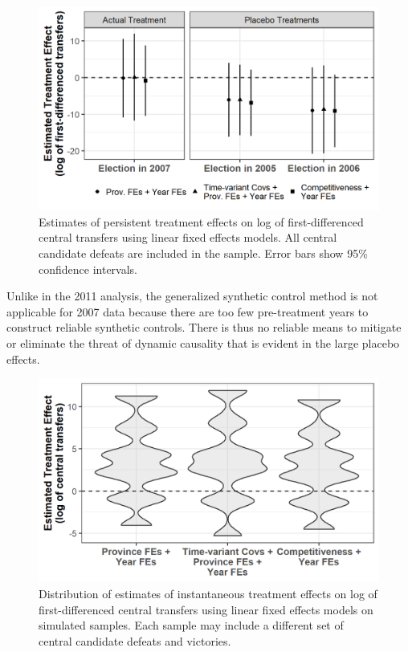 \documentclass[12pt]{article}
\newcommand{\1}{\mathbbm{1}}
\begin{document}
\begin{figure}[!htbp]
	\centering
	\includegraphics[]{figure/210202_lfe_placebo_2007.png}
	\captionsetup{singlelinecheck=off}
	\caption[Estimated placebo linear fixed effects treatment effects]{Estimates of persistent treatment effects on log of first-differenced central transfers using linear fixed effects models. All central candidate defeats are included in the sample. Error bars show 95\% confidence intervals.}
	\label{fig:lfe_placebo_2007}
\end{figure}

Unlike in the 2011 analysis, the generalized synthetic control method \citep{Xu2017gsynth} is not applicable for 2007 data because there are too few pre-treatment years to construct reliable synthetic controls. There is thus no reliable means to mitigate or eliminate the threat of dynamic causality that is evident in the large placebo effects. 

\begin{figure}[!htbp]
	\centering
	\includegraphics[]{figure/210202_impute_results_2007.png}
	\captionsetup{singlelinecheck=off}
	\caption[Estimated linear fixed effects treatment effects using simulated vote shares]{Distribution of estimates of instantaneous treatment effects on log of first-differenced central transfers using linear fixed effects models on simulated samples. Each sample may include a different set of central candidate defeats and victories.}
	\label{fig:impute_results_2007}
\end{figure}
\end{document}
